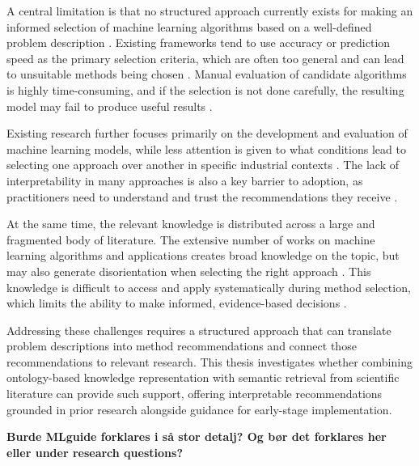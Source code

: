 A central limitation is that no structured approach currently 
exists for making an informed selection of machine learning 
algorithms based on a well-defined problem description 
\parencite{sonntag2023pattern_ml_product_development}. 
Existing frameworks tend to use accuracy or prediction speed 
as the primary selection criteria, which are often too general 
and can lead to unsuitable methods being chosen 
\parencite{sala2018selecting_ml_algorithm}. 
Manual evaluation of candidate algorithms is highly time-consuming, 
and if the selection is not done carefully, 
the resulting model may fail to produce useful results 
\parencite{ali2017accurate_multi_criteria_decision_making_methodology_recommending_machine_learning_algorithm}. 

Existing research further focuses primarily on the development 
and evaluation of machine learning models, while less attention 
is given to what conditions lead to selecting one approach 
over another in specific industrial contexts 
\parencite{arena2024conceptual_framework_ml_algorithm_selection_predictive_maintenance}. 
The lack of interpretability in many approaches is also a key 
barrier to adoption, as practitioners need to understand 
and trust the recommendations they receive 
\parencite{presciuttini2024ml_iot_manufacturing_operations}.

At the same time, the relevant knowledge is distributed across 
a large and fragmented body of literature. 
The extensive number of works on machine learning algorithms 
and applications creates broad knowledge on the topic, but may 
also generate disorientation when selecting the right approach 
\parencite{sala2018selecting_ml_algorithm}. 
This knowledge is difficult to access and apply systematically 
during method selection, which limits the ability to make 
informed, evidence-based decisions 
\parencite{adekoya2022applications_ai_em}.

Addressing these challenges requires a structured approach 
that can translate problem descriptions into method 
recommendations and connect those recommendations to 
relevant research. 
This thesis investigates whether combining ontology-based 
knowledge representation with semantic retrieval from 
scientific literature can provide such support, offering 
interpretable recommendations grounded in prior research 
alongside guidance for early-stage implementation.

\textbf{Burde MLguide forklares i så stor detalj? Og bør det forklares her eller under research questions?}

